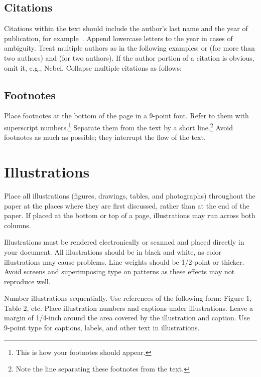 \documentclass{article}
\begin{document}
\subsection{Citations}

Citations within the text should include the author's last name and
the year of publication, for example~\cite{trc:ars}.  Append
lowercase letters to the year in cases of ambiguity.  Treat multiple
authors as in the following examples:
or (for more than two authors) and (for two authors).  If the author
portion of a citation is obvious, omit it, e.g.,
Nebel.  Collapse multiple citations as
follows:
~\cite{trc:ars}
~\cite{trc:hs}
~\cite{rupeneite:Reinforcement}
~\cite{russell-norvig:Modern}
~\cite{sqas:replay}

\subsection{Footnotes}

Place footnotes at the bottom of the page in a 9-point font.  Refer to
them with superscript numbers.\footnote{This is how your footnotes
should appear.} Separate them from the text by a short
line.\footnote{Note the line separating these footnotes from the
text.} Avoid footnotes as much as possible; they interrupt the flow of
the text.

\section{Illustrations}

Place all illustrations (figures, drawings, tables, and photographs)
throughout the paper at the places where they are first discussed,
rather than at the end of the paper. If placed at the bottom or top of
a page, illustrations may run across both columns.

Illustrations must be rendered electronically or scanned and placed
directly in your document. All illustrations should be in black and
white, as color illustrations may cause problems. Line weights should
be 1/2-point or thicker. Avoid screens and superimposing type on
patterns as these effects may not reproduce well.

Number illustrations sequentially. Use references of the following
form: Figure 1, Table 2, etc. Place illustration numbers and captions
under illustrations. Leave a margin of 1/4-inch around the area
covered by the illustration and caption.  Use 9-point type for
captions, labels, and other text in illustrations.
\fi
\end{document}
